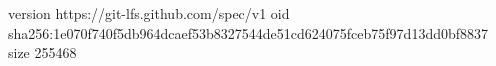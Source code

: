 version https://git-lfs.github.com/spec/v1
oid sha256:1e070f740f5db964dcaef53b8327544de51cd624075fceb75f97d13dd0bf8837
size 255468
